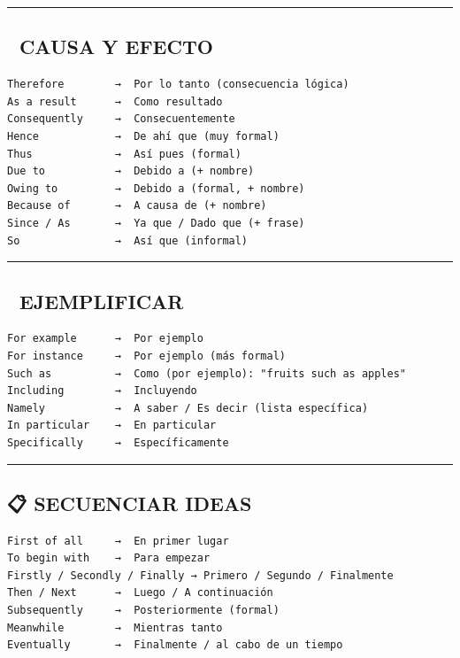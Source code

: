 \documentclass[
  spanish,
  letterpaper,
]{scrbook}
\begin{document}
\begin{center}\rule{0.5\linewidth}{0.5pt}\end{center}

\subsection{🎯 CAUSA Y EFECTO}\label{causa-y-efecto}

\begin{verbatim}
Therefore        →  Por lo tanto (consecuencia lógica)
As a result      →  Como resultado
Consequently     →  Consecuentemente
Hence            →  De ahí que (muy formal)
Thus             →  Así pues (formal)
Due to           →  Debido a (+ nombre)
Owing to         →  Debido a (formal, + nombre)
Because of       →  A causa de (+ nombre)
Since / As       →  Ya que / Dado que (+ frase)
So               →  Así que (informal)
\end{verbatim}

\begin{center}\rule{0.5\linewidth}{0.5pt}\end{center}

\subsection{📝 EJEMPLIFICAR}\label{ejemplificar}

\begin{verbatim}
For example      →  Por ejemplo
For instance     →  Por ejemplo (más formal)
Such as          →  Como (por ejemplo): "fruits such as apples"
Including        →  Incluyendo
Namely           →  A saber / Es decir (lista específica)
In particular    →  En particular
Specifically     →  Específicamente
\end{verbatim}

\begin{center}\rule{0.5\linewidth}{0.5pt}\end{center}

\subsection{📋 SECUENCIAR IDEAS}\label{secuenciar-ideas}

\begin{verbatim}
First of all     →  En primer lugar
To begin with    →  Para empezar
Firstly / Secondly / Finally → Primero / Segundo / Finalmente
Then / Next      →  Luego / A continuación
Subsequently     →  Posteriormente (formal)
Meanwhile        →  Mientras tanto
Eventually       →  Finalmente / al cabo de un tiempo
\end{verbatim}
\end{document}

